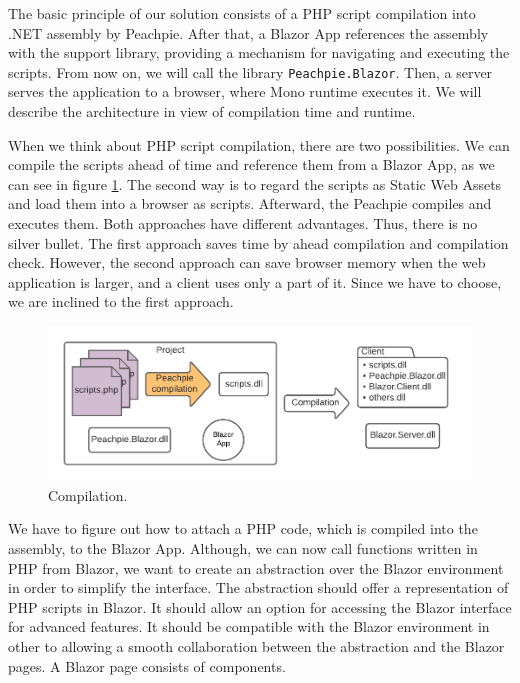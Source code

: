 The basic principle of our solution consists of a PHP script compilation into .NET assembly by Peachpie.
After that, a Blazor App references the assembly with the support library, providing a mechanism for navigating and executing the scripts.
From now on, we will call the library \texttt{Peachpie.Blazor}.
Then, a server serves the application to a browser, where Mono runtime executes it.
We will describe the architecture in view of compilation time and runtime.
\par
When we think about PHP script compilation, there are two possibilities.
We can compile the scripts ahead of time and reference them from a Blazor App, as we can see in figure \ref{img11:compilation}. 
The second way is to regard the scripts as Static Web Assets and load them into a browser as scripts.
Afterward, the Peachpie compiles and executes them.
Both approaches have different advantages. 
Thus, there is no silver bullet.
The first approach saves time by ahead compilation and compilation check.
However, the second approach can save browser memory when the web application is larger, and a client uses only a part of it.
Since we have to choose, we are inclined to the first approach.
\par
\begin{figure}[!b]\centering
\includegraphics[scale=0.8]{./img/Compilation}
\caption{Compilation.}
\label{img11:compilation}
\end{figure} 
\par
We have to figure out how to attach a PHP code, which is compiled into the assembly, to the Blazor App.
Although, we can now call functions written in PHP from Blazor, we want to create an abstraction over the Blazor environment in order to simplify the interface.
The abstraction should offer a representation of PHP scripts in Blazor.
It should allow an option for accessing the Blazor interface for advanced features.
It should be compatible with the Blazor environment in other to allowing a smooth collaboration between the abstraction and the Blazor pages.
A Blazor page consists of components.

